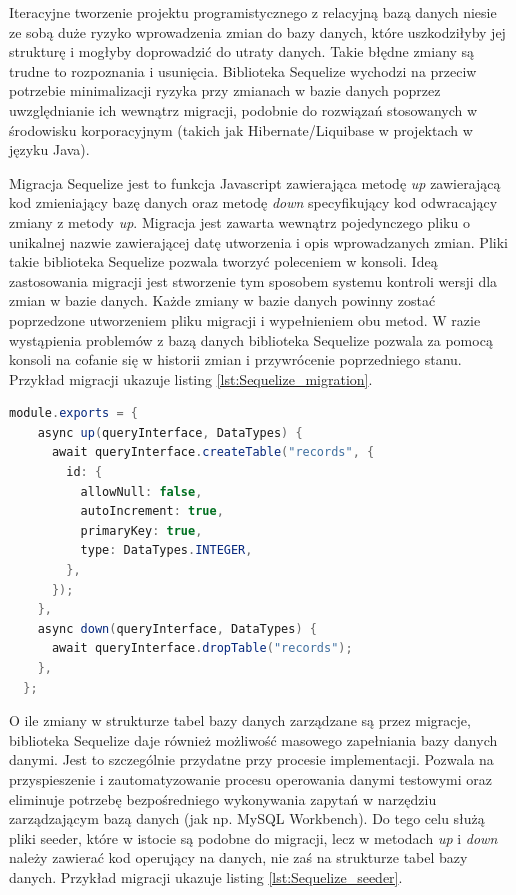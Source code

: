 \documentclass{sprz}
\begin{document}
Iteracyjne tworzenie projektu programistycznego z relacyjną bazą danych niesie ze sobą duże ryzyko wprowadzenia zmian do bazy danych, które uszkodziłyby jej strukturę i mogłyby doprowadzić do utraty danych. Takie błędne zmiany są trudne to rozpoznania i usunięcia. Biblioteka Sequelize wychodzi na przeciw potrzebie minimalizacji ryzyka przy zmianach w bazie danych poprzez uwzględnianie ich wewnątrz migracji, podobnie do rozwiązań stosowanych w środowisku korporacyjnym (takich jak Hibernate/Liquibase w projektach w języku Java).

Migracja Sequelize jest to funkcja Javascript zawierająca metodę \textit{up} zawierającą kod zmieniający bazę danych oraz metodę \textit{down} specyfikujący kod odwracający zmiany z metody \textit{up}. Migracja jest zawarta wewnątrz pojedynczego pliku o unikalnej nazwie zawierającej datę utworzenia i opis wprowadzanych zmian. Pliki takie biblioteka Sequelize pozwala tworzyć poleceniem w konsoli. Ideą zastosowania migracji jest stworzenie tym sposobem systemu kontroli wersji dla zmian w bazie danych. Każde zmiany w bazie danych powinny zostać poprzedzone utworzeniem pliku migracji i wypełnieniem obu metod. W razie wystąpienia problemów z bazą danych biblioteka Sequelize pozwala za pomocą konsoli na cofanie się w historii zmian i przywrócenie poprzedniego stanu. Przykład migracji ukazuje listing \ref{lst:Sequelize_migration}.

\begin{lstlisting}[language=Java,caption={Przykład pliku migracji}, label={lst:Sequelize_migration}]
  module.exports = {
    async up(queryInterface, DataTypes) {
      await queryInterface.createTable("records", {
        id: {
          allowNull: false,
          autoIncrement: true,
          primaryKey: true,
          type: DataTypes.INTEGER,
        },
      });
    },
    async down(queryInterface, DataTypes) {
      await queryInterface.dropTable("records");
    },
  };
\end{lstlisting}

O ile zmiany w strukturze tabel bazy danych zarządzane są przez migracje, biblioteka Sequelize daje również możliwość masowego zapełniania bazy danych danymi. Jest to szczególnie przydatne przy procesie implementacji. Pozwala na przyspieszenie i zautomatyzowanie procesu operowania danymi testowymi oraz eliminuje potrzebę bezpośredniego wykonywania zapytań w narzędziu zarządzającym bazą danych (jak np. MySQL Workbench). Do tego celu służą pliki seeder, które w istocie są podobne do migracji, lecz w metodach \textit{up} i \textit{down} należy zawierać kod operujący na danych, nie zaś na strukturze tabel bazy danych. Przykład migracji ukazuje listing \ref{lst:Sequelize_seeder}.
\end{document}
